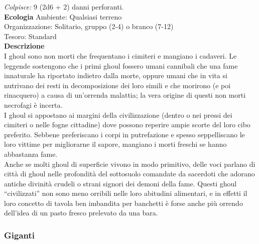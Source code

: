 \begin{multicols}{2}
\emph{Colpisce:} 9 (2d6 + 2) danni perforanti.\\
\textbf{Ecologia}
Ambiente: Qualsiasi terreno\\
Organizzazione: Solitario, gruppo (2-4) o branco (7-12)\\
Tesoro: Standard\\
\textbf{Descrizione}\\
I ghoul sono non morti che frequentano i cimiteri e mangiano i cadaveri. Le leggende sostengono che i primi ghoul fossero umani cannibali che una fame innaturale ha riportato indietro dalla morte, oppure umani che in vita si nutrivano dei resti in decomposizione dei loro simili e che morirono (e poi rinacquero) a causa di un’orrenda malattia; la vera origine di questi non morti necrofagi è incerta.\\
I ghoul si appostano ai margini della civilizzazione (dentro o nei pressi dei cimiteri o nelle fogne cittadine) dove possono reperire ampie scorte del loro cibo preferito. Sebbene preferiscano i corpi in putrefazione e spesso seppelliscano le loro vittime per migliorarne il sapore, mangiano i morti freschi se hanno abbastanza fame.\\

Anche se molti ghoul di superficie vivono in modo primitivo, delle voci parlano di città di ghoul nelle profondità del sottosuolo comandate da sacerdoti che adorano antiche divinità crudeli o strani signori dei demoni della fame. Questi ghoul “civilizzati” non sono meno orribili nelle loro abitudini alimentari, e in effetti il loro concetto di tavola ben imbandita per banchetti è forse anche più orrendo dell'idea di un pasto fresco prelevato da una bara.\\

\subsubsection{Giganti}


\end{multicols}
